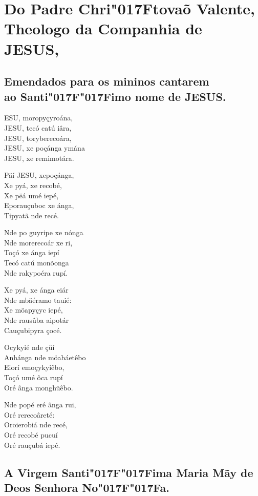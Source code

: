 \documentclass[openany,titlepage,12pt]{book}
\renewcommand{\sectionmark}[1]{\gdef\rightmark{#1}}
\newcommand{\lgS}{\char"017F}
\newcommand{\lgSS}{\char"017F\char"017F}
\begin{document}
\section{Do Padre Chri\lgS tovaõ Valente,\\Theologo da Companhia de JESUS,}
\sectionmark{Poemas Bra\lgS ilicos}

\subsection{Emendados para os mininos cantarem\\
ao Santi\lgSS imo nome de JESUS.}

\lettrine[findent =4pt, nindent=0pt, lines=5]
{}{E}SU, moropyçyroána,\\
JESU, tecó catú iâra,\\
JESU, toryberecoára,\\
JESU, xe poçánga ymána\\
JESU, xe remimotára.

Päí JESU, xepoçánga,\\
Xe pyá, xe recobé,\\
Xe pëá umé iepé,\\
Eporauçuboc xe ánga,\\
Tipyatã nde recé.

Nde po guyripe xe nónga\\
Nde morerecoár xe ri,\\
Toçó xe ánga iepí\\
Tecó catú monõonga\\%
Nde rakypoéra rupí.

Xe pyá, xe ánga eiár\\
Nde mbäéramo tauié:\\
Xe möapyçyc iepé,\\
Nde rausûba aipotár\\
Cauçubipyra çocé.

Ocykyié nde çüí\\
Anhánga nde möabáetêbo\\
Eiorí emoçykyiêbo,\\
Toçó umé ôca rupí\\
Oré ânga monghüêbo.

Nde popé eré ânga rui,\\
Oré rerecoâreté:\\
Oroierobiá nde recé,\\
Oré recobé pucuí\\
Oré rauçubá iepé.

\subsection{A Virgem Santi\lgSS ima Maria Mãy de Deos Senhora No\lgSS a.}
\end{document}
